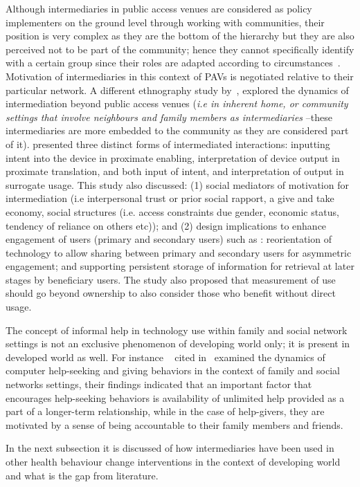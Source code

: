 Although intermediaries in public access venues are considered as policy implementers on the ground level through working with communities, their position is very complex as they are the bottom of the hierarchy but they are also perceived not to be part of the community; hence they cannot specifically identify with a certain group since their roles are adapted according to circumstances~\citep{bailur2010liminal}. Motivation of intermediaries in this context of PAVs is negotiated relative to their particular network. A different ethnography study by~\cite{sambasivan2010}, explored the dynamics of intermediation beyond public access venues (\emph{i.e in inherent home, or community settings that involve neighbours and family members as intermediaries} --these intermediaries are more embedded to the community as they are considered part of it). \cite{sambasivan2010} presented three distinct forms of intermediated interactions: inputting intent into the device in proximate enabling, interpretation of device output in proximate translation, and both input of intent, and interpretation of output in surrogate usage. This study also discussed: (1) social mediators of motivation for intermediation (i.e interpersonal trust or prior social rapport, a give and take economy, social structures (i.e. access constraints due gender, economic status, tendency of reliance on others etc)); and (2) design implications to enhance engagement of users (primary and secondary users) such as : reorientation of technology  to allow sharing between primary and secondary users for asymmetric engagement; and supporting persistent storage of information for retrieval at later stages by beneficiary users. The study also proposed that measurement of use should go beyond ownership to also consider those who benefit without direct usage. 

The concept of informal help in technology use within family and social network settings is not an exclusive  phenomenon of developing world only; it is present in developed world as well. For instance ~\cite{poole:chh} cited in~\cite{katule2016leveraging} examined the dynamics of computer help-seeking and giving behaviors in the context of family and social networks settings, their findings indicated that an important factor that  encourages help-seeking behaviors is availability of unlimited help provided as a part of a longer-term relationship, while in the case of help-givers, they are motivated by a sense of being accountable to their family members and friends.

In the next subsection it is discussed of how intermediaries have been used in other health behaviour change interventions in the context of developing world and what is the gap from literature.

